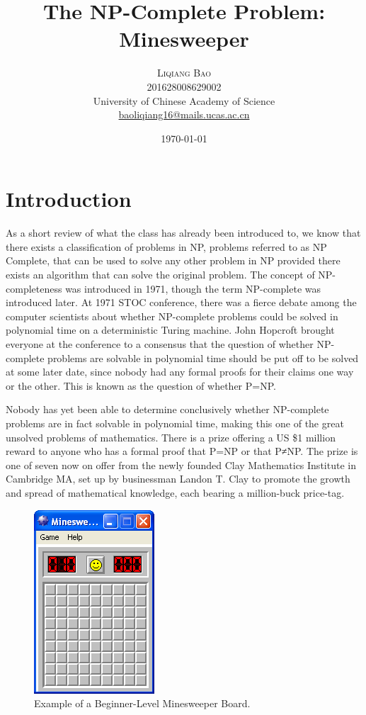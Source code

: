 \documentclass{article}
\title{The NP-Complete Problem: Minesweeper} %
\author{%
\textsc{Liqiang Bao} \\[1ex] %
\normalsize 201628008629002 \\
\normalsize University of Chinese Academy of Science \\ %
\normalsize \href{mailto:baoliqiang16@mails.ucas.ac.cn}{baoliqiang16@mails.ucas.ac.cn} %
}
\date{\today} %
\begin{document}
\maketitle


\section{Introduction}

As a short review of what the class has already been introduced to, we know that there exists a classification of problems in NP, problems referred to as NP Complete, that can be used to solve any other problem in NP provided there exists an algorithm that can solve the original problem. The concept of NP-completeness was introduced in 1971, though the term NP-complete was introduced later. At 1971 STOC conference, there was a fierce debate among the computer scientists about whether NP-complete problems could be solved in polynomial time on a deterministic Turing machine. John Hopcroft brought everyone at the conference to a consensus that the question of whether NP-complete problems are solvable in polynomial time should be put off to be solved at some later date, since nobody had any formal proofs for their claims one way or the other. This is known as the question of whether P=NP.

Nobody has yet been able to determine conclusively whether NP-complete problems are in fact solvable in polynomial time, making this one of the great unsolved problems of mathematics. There is a prize offering a US \$1 million reward to anyone who has a formal proof that P=NP or that P≠NP. The prize is one of seven now on offer from the newly founded Clay Mathematics Institute in Cambridge MA, set up by businessman Landon T. Clay to promote the growth and spread of mathematical knowledge, each bearing a million-buck price-tag.

\begin{figure}[H]
   \centering
   \includegraphics[scale=0.6]{images/minesweeper.png}
   \caption[]{Example of a Beginner-Level Minesweeper Board.}
   \label{fig_ms}
\end{figure}
\end{document}
